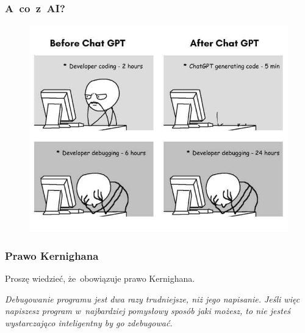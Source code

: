 \documentclass[10pt,t]{beamer}
\begin{document}
\begin{frame}
  \frametitle{A~co~z~AI?}

  \vspace{-0.5em}


  \begin{figure}

    \label{fig:Impact-of-ChatGPT-One-view}

    \centering


    \includegraphics[scale=0.38]
    {./Presentations-pictures/Impact-of-ChatGPT-One-view.jpg}

  \end{figure}

\end{frame}





\begin{frame}
  \frametitle{Prawo Kernighana}


  Proszę wiedzieć, że~obowiązuje prawo Kernighana.

  \textit{Debugowanie programu jest dwa razy trudniejsze, niż jego
    napisanie. Jeśli więc napiszesz program w~najbardziej pomysłowy sposób
    jaki możesz, to nie jesteś wystarczająco inteligentny by go zdebugować.}







\end{frame}
\end{document}
